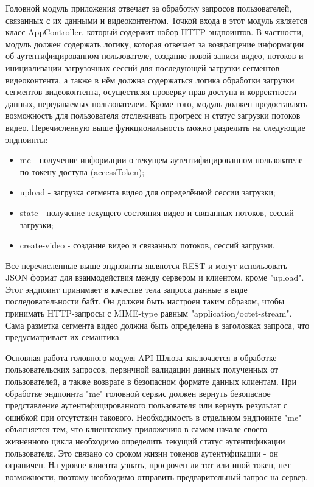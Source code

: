 	Головной модуль приложения отвечает за обработку запросов пользователей, связанных с их данными и видеоконтентом. Точкой входа в этот модуль является класс AppController, который содержит набор HTTP-эндпоинтов. В частности, модуль должен содержать логику, которая отвечает за возвращение информации об аутентифицированном пользователе, создание новой записи видео, потоков и инициализации загрузочных сессий для последующей загрузки сегментов видеоконтента, а также в нём должна содержаться логика обработки загрузки сегментов видеоконтента, осуществляя проверку прав доступа и корректности данных, передаваемых пользователем. Кроме того, модуль должен предоставлять возможность для пользователя отслеживать прогресс и статус загрузки потоков видео. Перечисленную выше функциональность можно разделить на следующие эндпоинты:

	\begin{itemize}[label=$\bullet$]
		\item me - получение информации о текущем аутентифицированном пользователе по токену доступа (accessToken);
		\item upload - загрузка сегмента видео для определённой сессии загрузки;
		\item state - получение текущего состояния видео и связанных потоков, сессий загрузки;
		\item create-video - создание видео и связанных потоков, сессий загрузки.
	\end{itemize}

	Все перечисленные выше эндпоинты являются REST и могут использовать JSON формат для взаимодействия между сервером и клиентом, кроме "upload". Этот эндпоинт принимает в качестве тела запроса данные в виде последовательности байт. Он должен быть настроен таким образом, чтобы принимать HTTP-запросы с MIME-type равным "application/octet-stream". Сама разметка сегмента видео должна быть определена в заголовках запроса, что предусматривает их семантика.

	Основная работа головного модуля API-Шлюза заключается в обработке пользовательских запросов, первичной валидации данных полученных от пользователей, а также возврате в безопасном формате данных клиентам. При обработке эндпоинта "me" головной сервис должен вернуть безопасное представление аутентифицированного пользователя или вернуть результат с ошибкой при отсутствии такового. Необходимость в отдельном эндпоинте "me" объясняется тем, что клиентскому приложению в самом начале своего жизненного цикла необходимо определить текущий статус аутентификации пользователя. Это связано со сроком жизни токенов аутентификации - он ограничен. На уровне клиента узнать, просрочен ли тот или иной токен, нет возможности, поэтому необходимо отправить предварительный запрос на сервер.
	
